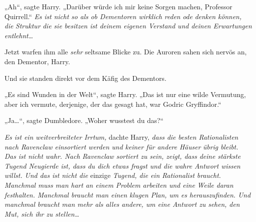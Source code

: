 „Ah“, sagte Harry. „Darüber würde ich mir keine Sorgen machen, Professor Quirrell.“ \emph{Es ist nicht so als ob Dementoren wirklich reden} \emph{ode} \emph{denken können, die} \emph{Struktur} \emph{die sie besitzen ist deinem eigenen Verstand und deinen Erwartungen entlehnt…}

Jetzt warfen ihm alle \emph{sehr} seltsame Blicke zu. Die Auroren sahen sich nervös an, den Dementor, Harry.

Und sie standen direkt vor dem Käfig des Dementors.

„Es sind Wunden in der Welt“, sagte Harry. „Das ist nur eine wilde Vermutung, aber ich vermute, derjenige, der das gesagt hat, war Godric Gryffindor.“

„Ja…“, sagte Dumbledore. „Woher wusstest du das?“

\emph{Es ist ein weitverbreiteter Irrtum,} dachte Harry, \emph{dass die besten Rationalisten nach Ravenclaw einsortiert werden und keiner für andere Häuser} \emph{übrig bleibt. Das ist nicht wahr. Nach Ravenclaw sortiert zu sein, zeigt, dass deine stärkste Tugend Neugierde ist, dass du dich etwas fragst und die wahre Antwort wissen willst. Und das ist nicht die} einzige \emph{Tugend, die ein Rationalist braucht. Manchmal muss man hart an einem Problem arbeiten und eine Weile daran festhalten. Manchmal braucht man einen klugen Plan, um es herauszufinden. Und manchmal braucht man mehr als alles andere, um eine Antwort zu sehen, den Mut, sich ihr zu stellen…}

